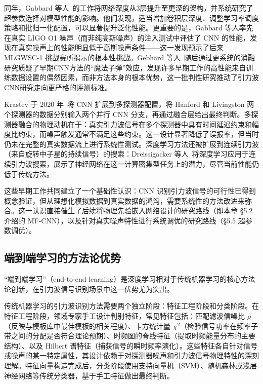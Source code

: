 同年，Gabbard 等人~\cite{Gabbard2018CNN}的工作将网络深度从3层提升至更深的架构，并系统研究了超参数选择对模型性能的影响。他们发现，适当增加卷积层深度、调整学习率调度策略和批归一化配置，可以显著提升泛化性能。更重要的是，Gabbard 等人率先在真实 LIGO O1 噪声（而非纯高斯噪声）的注入测试中评估了 CNN 的性能，发现在真实噪声上的性能明显低于高斯噪声条件——这一发现预示了后来 MLGWSC-1 挑战赛所揭示的根本性挑战。Gebhard 等人~\cite{Gebhard2019CNN}随后通过更系统的消融研究质疑了早期CNN方法的“魔法子弹”效应，发现许多早期工作的高性能来自训练数据设置的偶然因素，而非方法本身的根本优势，这一批判性研究推动了引力波CNN研究走向更严格的评测标准。

Krastev 于 2020 年~\cite{Krastev2020LSTM}将 CNN 扩展到多探测器配置，将 Hanford 和 Livingston 两个探测器的数据分别输入两个并行 CNN 分支，再通过融合层给出最终判断。多探测器融合的物理动机在于：真实引力波信号在多个探测器中具有时间延迟约束和幅度比约束，而噪声触发通常不满足这些约束。这一设计显著降低了误报率，但当时仍未在完整的真实数据流上进行系统性测试。深度学习方法还被扩展到连续引力波（来自旋转中子星的持续信号）的搜索：Dreissigacker 等人~\cite{Dreissigacker2019RNN}将深度学习应用于连续引力波搜索，展示了神经网络在这一计算密集型任务上的潜力，尽管当前性能仍低于传统方法。

这些早期工作共同建立了一个基础性认识：CNN 识别引力波信号的可行性已得到概念验证，但从理想化模拟数据到真实数据的鸿沟，需要系统性的方法改进来弥合。这一认识直接催生了后续将物理先验嵌入网络设计的研究路线（即本章 §5.2 介绍的 MF-CNN），以及针对真实噪声特性进行系统调优的研究路线（§5.5 超参数调优）。

\subsection{端到端学习的方法论优势}

“端到端学习”（end-to-end learning）是深度学习相对于传统机器学习的核心方法论创新，在引力波信号识别场景中这一优势尤为突出。

传统机器学习的引力波识别方法需要两个独立阶段：特征工程阶段和分类阶段。在特征工程阶段，领域专家手工设计判别特征，常见特征包括：匹配滤波信噪比 $\rho$（反映与模板库中最佳模板的相关程度）、卡方统计量 $\chi^2$（检验信号功率在频率子带之间的分配是否符合理论预期）、时频图的脊线特征（提取时频能量分布的主要结构）、以及 Hilbert 谱特征（捕获信号的瞬时频率演化）。这些特征各自针对信号或噪声的某一特定属性，其设计依赖于对探测器噪声和引力波信号物理特性的深刻理解。特征向量构造完成后，分类阶段使用支持向量机（SVM）、随机森林或浅层神经网络等传统分类器，基于手工特征做出最终判断。

